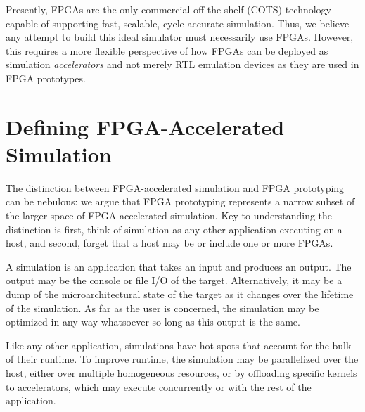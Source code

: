 Presently, FPGAs are the only commercial off-the-shelf (COTS) technology
capable of supporting fast, scalable, cycle-accurate simulation. Thus, we
believe any attempt to build this ideal simulator must necessarily use FPGAs.
However, this requires a more flexible perspective of how FPGAs can be deployed as
simulation \emph{accelerators} and not merely RTL emulation devices as they are
used in FPGA prototypes.

\section{Defining FPGA-Accelerated Simulation}

The distinction between FPGA-accelerated simulation and FPGA prototyping can be
nebulous: we argue that FPGA prototyping represents a narrow subset of the larger
space of FPGA-accelerated simulation. Key to understanding the distinction is
first, think of simulation as any other application executing on a host, and
second, forget that a host may be or include one or more FPGAs.

A simulation is an application that takes an input and produces an output.  The
output may be the console or file I/O of the target.  Alternatively, it may be
a dump of the microarchitectural state of the target as it changes over the
lifetime of the simulation.  As far as the user is concerned, the simulation
may be optimized in any way whatsoever so long as this output is the same.

Like any other application, simulations have hot spots that account for the bulk
of their runtime. To improve runtime, the simulation may be parallelized over
the host, either over multiple homogeneous resources, or by offloading specific
kernels to accelerators, which may execute concurrently or with the rest
of the application.


